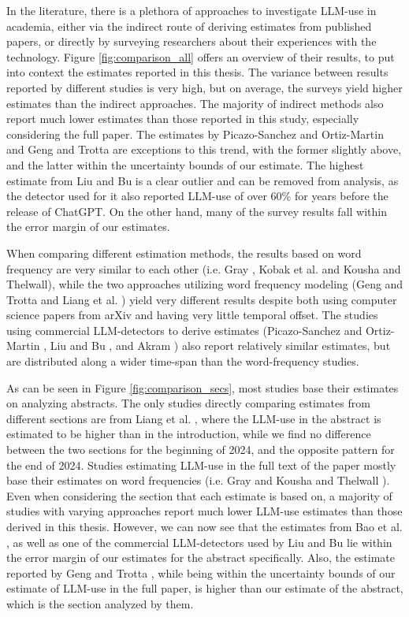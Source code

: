 In the literature, there is a plethora of approaches to investigate LLM-use in academia, either via the indirect route of deriving estimates from published papers, or directly by surveying researchers about their experiences with the technology.
Figure \ref{fig:comparison_all} offers an overview of their results, to put into context the estimates reported in this thesis.
The variance between results reported by different studies is very high, but on average, the surveys yield higher estimates than the indirect approaches.
The majority of indirect methods also report much lower estimates than those reported in this study, especially considering the full paper.
The estimates by Picazo-Sanchez and Ortiz-Martin \cite{Picazo-Sanchez2024} and Geng and Trotta \cite{Geng2024} are exceptions to this trend, with the former slightly above, and the latter within the uncertainty bounds of our estimate. 
The highest estimate from Liu and Bu \cite{Liu2024_profiles} is a clear outlier and can be removed from analysis, as the detector used for it also reported LLM-use of over 60\% for years before the release of ChatGPT. 
On the other hand, many of the survey results fall within the error margin of our estimates.

When comparing different estimation methods, the results based on word frequency are very similar to each other (i.e. Gray \cite{Gray2026}, Kobak et al. \cite{Kobak2025} and Kousha and Thelwall\cite{Kousha2025}), while the two approaches utilizing word frequency modeling (Geng and Trotta \cite{Geng2024} and Liang et al. \cite{Liang2024_paper,Liang2025}) yield very different results despite both using computer science papers from arXiv and having very little temporal offset.
The studies using commercial LLM-detectors to derive estimates (Picazo-Sanchez and Ortiz-Martin \cite{Picazo-Sanchez2024}, Liu and Bu \cite{Liu2024_profiles}, and Akram \cite{Akram2024}) also report relatively similar estimates, but are distributed along a wider time-span than the word-frequency studies.

As can be seen in Figure \ref{fig:comparison_secs}, most studies base their estimates on analyzing abstracts. 
The only studies directly comparing estimates from different sections are from Liang et al. \cite{Liang2024_paper,Liang2025}, where the LLM-use in the abstract is estimated to be higher than in the introduction, while we find no difference between the two sections for the beginning of 2024, and the opposite pattern for the end of 2024.
Studies estimating LLM-use in the full text of the paper mostly base their estimates on word frequencies (i.e. Gray \cite{Gray2025, Gray2026} and Kousha and Thelwall \cite{Kousha2025}).
Even when considering the section that each estimate is based on, a majority of studies with varying approaches report much lower LLM-use estimates than those derived in this thesis.
However, we can now see that the estimates from Bao et al. \cite{Bao2025_classifier}, as well as one of the commercial LLM-detectors used by Liu and Bu \cite{Liu2024_profiles} lie within the error margin of our estimates for the abstract specifically.
Also, the estimate reported by Geng and Trotta \cite{Geng2024}, while being within the uncertainty bounds of our estimate of LLM-use in the full paper, is higher than our estimate of the abstract, which is the section analyzed by them. 